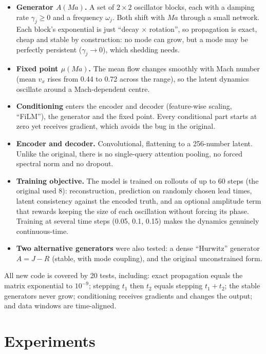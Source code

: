 \documentclass[10.5pt,a4paper]{article}
\begin{document}
\begin{itemize}
\item \textbf{Generator $A(Ma)$.} A set of $2\times2$ oscillator blocks, each with a damping
  rate $\gamma_j \ge 0$ and a frequency $\omega_j$. Both shift with $Ma$ through a small
  network. Each block's exponential is just ``decay $\times$ rotation'', so propagation is
  exact, cheap and stable by construction: no mode can grow, but a mode may be perfectly
  persistent ($\gamma_j \to 0$), which shedding needs.
\item \textbf{Fixed point $\mu(Ma)$.} The mean flow changes smoothly with Mach number (mean
  $v_x$ rises from 0.44 to 0.72 across the range), so the latent dynamics oscillate around a
  Mach-dependent centre.
\item \textbf{Conditioning} enters the encoder and decoder (feature-wise scaling, ``FiLM''),
  the generator and the fixed point. Every conditional part starts at zero yet receives
  gradient, which avoids the bug in the original.
\item \textbf{Encoder and decoder.} Convolutional, flattening to a 256-number latent. Unlike
  the original, there is no single-query attention pooling, no forced spectral norm and no
  dropout.
\item \textbf{Training objective.} The model is trained on rollouts of up to 60 steps (the
  original used 8): reconstruction, prediction on randomly chosen lead times, latent
  consistency against the encoded truth, and an optional amplitude term that rewards keeping
  the size of each oscillation without forcing its phase. Training at several time steps
  (0.05, 0.1, 0.15) makes the dynamics genuinely continuous-time.
\item \textbf{Two alternative generators} were also tested: a dense ``Hurwitz''
  generator $A = J - R$ (stable, with mode coupling), and the original unconstrained form.
\end{itemize}

\noindent All new code is covered by 20 tests, including: exact propagation equals the matrix
exponential to $10^{-9}$; stepping $t_1$ then $t_2$ equals stepping $t_1{+}t_2$; the stable
generators never grow; conditioning receives gradients and changes the output; and data
windows are time-aligned.

\section{Experiments}\label{sec:exp}
\end{document}
